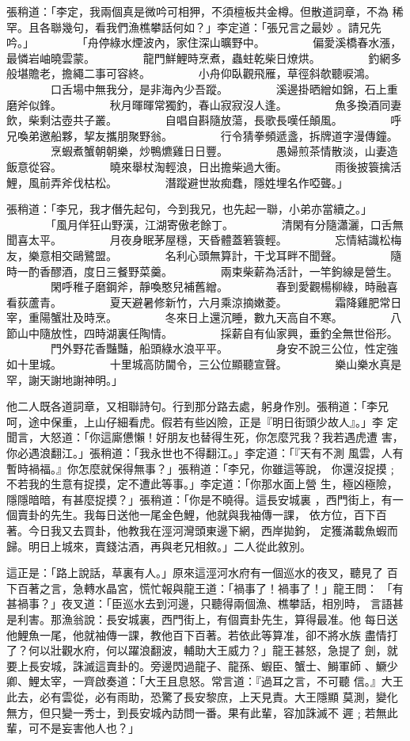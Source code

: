 \begin{pinyinscope}
{張稍道：「李定，我兩個真是微吟可相狎，不須檀板共金樽。但散道詞章，不為
        稀罕。且各聯幾句，看我們漁樵攀話何如？」李定道：「張兄言之最妙
       。請兄先吟。」
　　　　「舟停綠水煙波內，家住深山曠野中。
　　　　偏愛溪橋春水漲，最憐岩岫曉雲蒙。
　　　　龍門鮮鯉時烹煮，蟲蛀乾柴日燎烘。
　　　　釣網多般堪贍老，擔繩二事可容終。
　　　　小舟仰臥觀飛雁，草徑斜欹聽唳鴻。
　　　　口舌場中無我分，是非海內少吾蹤。
　　　　溪邊掛晒繒如錦，石上重磨斧似鋒。
　　　　秋月暉暉常獨釣，春山寂寂沒人逢。
　　　　魚多換酒同妻飲，柴剩沽壺共子叢。
　　　　自唱自斟隨放蕩，長歌長嘆任顛風。
　　　　呼兄喚弟邀船夥，挈友攜朋聚野翁。
　　　　行令猜拳頻遞盞，拆牌道字漫傳鐘。
　　　　烹蝦煮蟹朝朝樂，炒鴨爊雞日日豐。
　　　　愚婦煎茶情散淡，山妻造飯意從容。
　　　　曉來舉杖淘輕浪，日出擔柴過大衝。
　　　　雨後披簑擒活鯉，風前弄斧伐枯松。
　　　　潛蹤避世妝痴蠢，隱姓埋名作啞聾。」

張稍道：「李兄，我才僭先起句，今到我兄，也先起一聯，小弟亦當續之。」
　　　　「風月佯狂山野漢，江湖寄傲老餘丁。
　　　　清閑有分隨瀟灑，口舌無聞喜太平。
　　　　月夜身眠茅屋穩，天昏體蓋箬簑輕。
　　　　忘情結識松梅友，樂意相交鷗鷺盟。
　　　　名利心頭無算計，干戈耳畔不聞聲。
　　　　隨時一酌香醪酒，度日三餐野菜羹。
　　　　兩束柴薪為活計，一竿鉤線是營生。
　　　　閑呼稚子磨鋼斧，靜喚憨兒補舊繒。
　　　　春到愛觀楊柳綠，時融喜看荻蘆青。
　　　　夏天避暑修新竹，六月乘涼摘嫩菱。
　　　　霜降雞肥常日宰，重陽蟹壯及時烹。
　　　　冬來日上還沉睡，數九天高自不寒。
　　　　八節山中隨放性，四時湖裏任陶情。
　　　　採薪自有仙家興，垂釣全無世俗形。
　　　　門外野花香豔豔，船頭綠水浪平平。
　　　　身安不說三公位，性定強如十里城。
　　　　十里城高防閫令，三公位顯聽宣聲。
　　　　樂山樂水真是罕，謝天謝地謝神明。」

他二人既各道詞章，又相聯詩句。行到那分路去處，躬身作別。張稍道：「李兄
呵，途中保重，上山仔細看虎。假若有些凶險，正是『明日街頭少故人』。」李
定聞言，大怒道：「你這廝憊懶！好朋友也替得生死，你怎麼咒我？我若遇虎遭
害，你必遇浪翻江。」張稍道：「我永世也不得翻江。」李定道：「『天有不測
風雲，人有暫時禍福。』你怎麼就保得無事？」張稍道：「李兄，你雖這等說，
你還沒捉摸﹔不若我的生意有捉摸，定不遭此等事。」李定道：「你那水面上營
生，極凶極險，隱隱暗暗，有甚麼捉摸？」張稍道：「你是不曉得。這長安城裏
，西門街上，有一個賣卦的先生。我每日送他一尾金色鯉，他就與我袖傳一課，
依方位，百下百著。今日我又去買卦，他教我在涇河灣頭東邊下網，西岸拋鉤，
定獲滿載魚蝦而歸。明日上城來，賣錢沽酒，再與老兄相敘。」二人從此敘別。

這正是：「路上說話，草裏有人。」原來這涇河水府有一個巡水的夜叉，聽見了
百下百著之言，急轉水晶宮，慌忙報與龍王道：「禍事了！禍事了！」龍王問：
「有甚禍事？」夜叉道：「臣巡水去到河邊，只聽得兩個漁、樵攀話，相別時，
言語甚是利害。那漁翁說：長安城裏，西門街上，有個賣卦先生，算得最准。他
每日送他鯉魚一尾，他就袖傳一課，教他百下百著。若依此等算准，卻不將水族
盡情打了？何以壯觀水府，何以躍浪翻波，輔助大王威力？」龍王甚怒，急提了
劍，就要上長安城，誅滅這賣卦的。旁邊閃過龍子、龍孫、蝦臣、蟹士、鰣軍師
、鱖少卿、鯉太宰，一齊啟奏道：「大王且息怒。常言道：『過耳之言，不可聽
信。』大王此去，必有雲從，必有雨助，恐驚了長安黎庶，上天見責。大王隱顯
莫測，變化無方，但只變一秀士，到長安城內訪問一番。果有此輩，容加誅滅不
遲﹔若無此輩，可不是妄害他人也？」

}
\end{pinyinscope}
